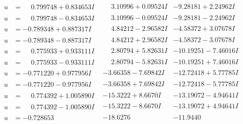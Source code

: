 \documentclass[1p]{elsarticle_modified}
\theoremstyle{definition}
\begin{document}
$$\begin{array}{c|c|c}
\begin{aligned}
u &= \phantom{-}0.799748 + 0.834653 I\end{aligned}
 & \phantom{-}3.10996 + 0.09524 I & -9.28181 + 2.24962 I \\ \hline\begin{aligned}
u &= \phantom{-}0.799748 - 0.834653 I\end{aligned}
 & \phantom{-}3.10996 - 0.09524 I & -9.28181 - 2.24962 I \\ \hline\begin{aligned}
u &= -0.789348 + 0.887317 I\end{aligned}
 & \phantom{-}4.84212 - 2.96582 I & -4.58372 + 3.07678 I \\ \hline\begin{aligned}
u &= -0.789348 - 0.887317 I\end{aligned}
 & \phantom{-}4.84212 + 2.96582 I & -4.58372 - 3.07678 I \\ \hline\begin{aligned}
u &= \phantom{-}0.775933 + 0.933111 I\end{aligned}
 & \phantom{-}2.80794 + 5.82631 I & -10.19251 - 7.46016 I \\ \hline\begin{aligned}
u &= \phantom{-}0.775933 - 0.933111 I\end{aligned}
 & \phantom{-}2.80794 - 5.82631 I & -10.19251 + 7.46016 I \\ \hline\begin{aligned}
u &= -0.771220 + 0.977956 I\end{aligned}
 & -3.66358 - 7.69842 I & -12.72418 + 5.77785 I \\ \hline\begin{aligned}
u &= -0.771220 - 0.977956 I\end{aligned}
 & -3.66358 + 7.69842 I & -12.72418 - 5.77785 I \\ \hline\begin{aligned}
u &= \phantom{-}0.774392 + 1.005890 I\end{aligned}
 & -15.3222 + 8.6670 I & -13.19072 - 4.94641 I \\ \hline\begin{aligned}
u &= \phantom{-}0.774392 - 1.005890 I\end{aligned}
 & -15.3222 - 8.6670 I & -13.19072 + 4.94641 I \\ \hline\begin{aligned}
u &= -0.728653\phantom{ +0.000000I}\end{aligned}
 & -18.6276\phantom{ +0.000000I} & -11.9440\phantom{ +0.000000I} \\ \hline\begin{aligned}

\end{aligned}
\end{array}$$
\end{document}
